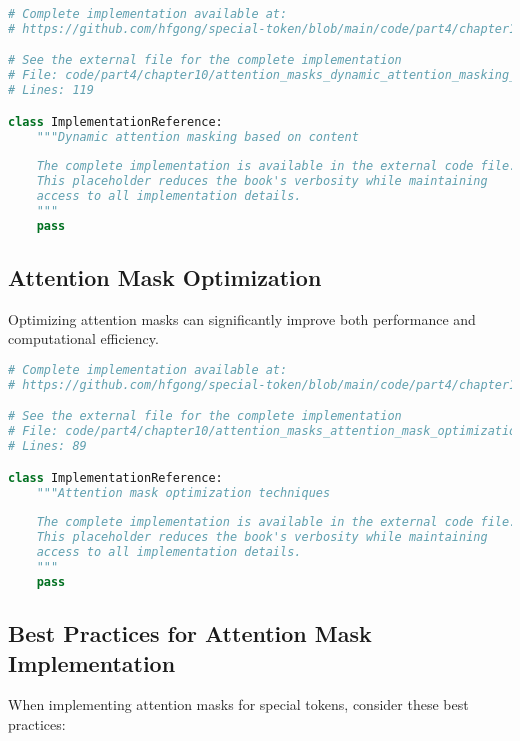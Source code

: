 \begin{lstlisting}[language=Python, caption={Dynamic attention masking based on content}]
# Complete implementation available at:
# https://github.com/hfgong/special-token/blob/main/code/part4/chapter10/attention_masks_dynamic_attention_masking_base.py

# See the external file for the complete implementation
# File: code/part4/chapter10/attention_masks_dynamic_attention_masking_base.py
# Lines: 119

class ImplementationReference:
    """Dynamic attention masking based on content
    
    The complete implementation is available in the external code file.
    This placeholder reduces the book's verbosity while maintaining
    access to all implementation details.
    """
    pass
\end{lstlisting}

\subsection{Attention Mask Optimization}

Optimizing attention masks can significantly improve both performance and computational efficiency.

\begin{lstlisting}[language=Python, caption={Attention mask optimization techniques}]
# Complete implementation available at:
# https://github.com/hfgong/special-token/blob/main/code/part4/chapter10/attention_masks_attention_mask_optimization_te.py

# See the external file for the complete implementation
# File: code/part4/chapter10/attention_masks_attention_mask_optimization_te.py
# Lines: 89

class ImplementationReference:
    """Attention mask optimization techniques
    
    The complete implementation is available in the external code file.
    This placeholder reduces the book's verbosity while maintaining
    access to all implementation details.
    """
    pass
\end{lstlisting}

\subsection{Best Practices for Attention Mask Implementation}

When implementing attention masks for special tokens, consider these best practices:

